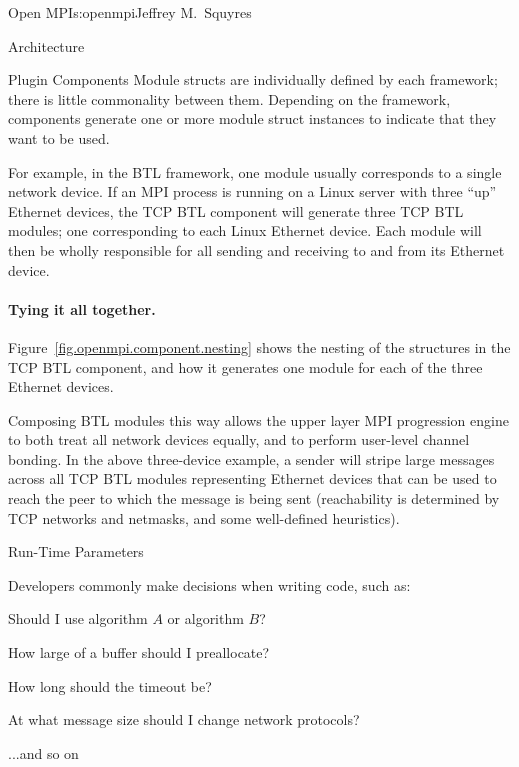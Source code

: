 \begin{aosachapter}{Open MPI}{s:openmpi}{Jeffrey M.\ Squyres}
\begin{aosasect1}{Architecture}
\begin{aosasect2}{Plugin Components}
Module structs are individually defined by each framework; there is
little commonality between them.
%
Depending on the framework, components generate one or more module
struct instances to indicate that they want to be used.

For example, in the BTL framework, one module usually corresponds to a
single network device.  
%
If an MPI process is running on a Linux server with three ``up''
Ethernet devices, the TCP BTL component will generate three TCP BTL
modules; one corresponding to each Linux Ethernet device.
%
Each module will then be wholly responsible for all sending and
receiving to and from its Ethernet device.


\paragraph{Tying it all together.}

Figure~\ref{fig.openmpi.component.nesting} shows the nesting of the
structures in the TCP BTL component, and how it generates one module
for each of the three Ethernet devices.


Composing BTL modules this way allows the upper layer MPI progression
engine to both treat all network devices equally, and to perform
user-level channel bonding.  
%
In the above three-device example, a sender will stripe large messages
across all TCP BTL modules representing Ethernet devices that can be
used to reach the peer to which the message is being sent
(reachability is determined by TCP networks and netmasks, and some
well-defined heuristics).

\end{aosasect2}


\begin{aosasect2}{Run-Time Parameters}

Developers commonly make decisions when writing code, such as:

\begin{aosaitemize}
\item Should I use algorithm $A$ or algorithm $B$?
\item How large of a buffer should I preallocate?
\item How long should the timeout be?
\item At what message size should I change network protocols?
\item ...and so on
\end{aosaitemize}


\end{aosasect2}
\end{aosasect1}
\end{aosachapter}
